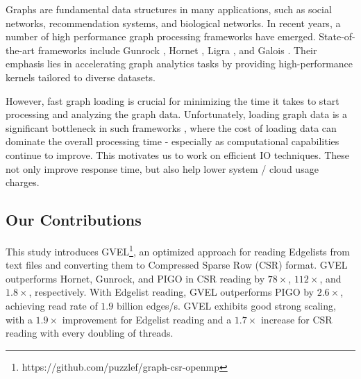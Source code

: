 Graphs are fundamental data structures in many applications, such as social networks, recommendation systems, and biological networks. In recent years, a number of high performance graph processing frameworks have emerged. State-of-the-art frameworks include Gunrock \cite{wang2016gunrock}, Hornet \cite{busato2018hornet}, Ligra \cite{shun2013ligra}, and Galois \cite{nguyen2013lightweight}. Their emphasis lies in accelerating graph analytics tasks by providing high-performance kernels tailored to diverse datasets.

However, fast graph loading is crucial for minimizing the time it takes to start processing and analyzing the graph data. Unfortunately, loading graph data is a significant bottleneck in such frameworks \cite{gabert2021pigo}, where the cost of loading data can dominate the overall processing time - especially as computational capabilities continue to improve. This motivates us to work on efficient IO techniques. These not only improve response time, but also help lower system / cloud usage charges.




\subsection{Our Contributions}

This study introduces GVEL\footnote{https://github.com/puzzlef/graph-csr-openmp}, an optimized approach for reading Edgelists from text files and converting them to Compressed Sparse Row (CSR) format. GVEL outperforms Hornet, Gunrock, and PIGO in CSR reading by $78\times$, $112\times$, and $1.8\times$, respectively. With Edgelist reading, GVEL outperforms PIGO by $2.6\times$, achieving read rate of $1.9$ billion edges/s. GVEL exhibits good strong scaling, with a $1.9\times$ improvement for Edgelist reading and a $1.7\times$ increase for CSR reading with every doubling of threads.




